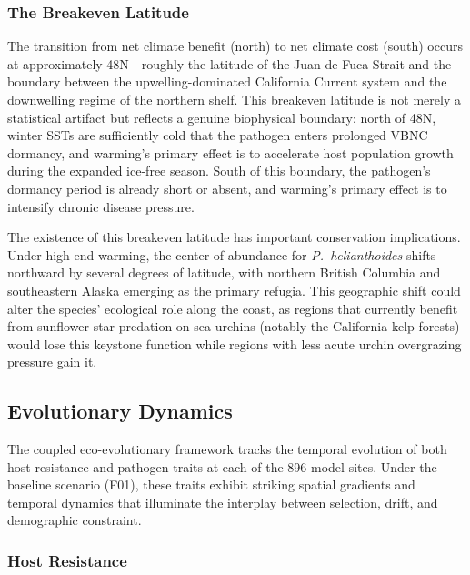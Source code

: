 \subsubsection{The Breakeven Latitude}

The transition from net climate benefit (north) to net climate cost
(south) occurs at approximately 48\textdegree N---roughly the latitude
of the Juan de Fuca Strait and the boundary between the
upwelling-dominated California Current system and the downwelling
regime of the northern shelf.  This breakeven latitude is not merely a
statistical artifact but reflects a genuine biophysical boundary: north
of 48\textdegree N, winter SSTs are sufficiently cold that the pathogen
enters prolonged VBNC dormancy, and warming's primary effect is to
accelerate host population growth during the expanded ice-free season.
South of this boundary, the pathogen's dormancy period is already short
or absent, and warming's primary effect is to intensify chronic disease
pressure.

The existence of this breakeven latitude has important conservation
implications.  Under high-end warming, the center of abundance for
\textit{P.~helianthoides} shifts northward by several degrees of
latitude, with northern British Columbia and southeastern Alaska
emerging as the primary refugia.  This geographic shift could alter the
species' ecological role along the coast, as regions that currently
benefit from sunflower star predation on sea urchins (notably the
California kelp forests) would lose this keystone function while
regions with less acute urchin overgrazing pressure gain it.

\subsection{Evolutionary Dynamics}
\label{sec:evo_dynamics}

The coupled eco-evolutionary framework tracks the temporal evolution of
both host resistance and pathogen traits at each of the 896 model
sites.  Under the baseline scenario (F01), these traits exhibit
striking spatial gradients and temporal dynamics that illuminate the
interplay between selection, drift, and demographic constraint.

\subsubsection{Host Resistance}

